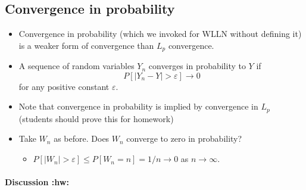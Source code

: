 \subsection{Convergence in probability}
\label{sec-1-3}

\begin{itemize}
\item Convergence in probability (which we invoked for WLLN without
       defining it) is a weaker form of convergence than $L_p$
       convergence.
\item A sequence of random variables $Y_n$ converges in probability to
       $Y$ if \[ P[\lvert Y_n - Y \rvert > \varepsilon] \to 0 \] for
       any positive constant $\varepsilon$.
\item Note that convergence in probability is implied by convergence
       in $L_p$ (students should prove this for homework)
\item Take $W_n$ as before.  Does $W_n$ converge to zero in probability?
\begin{itemize}
\item $P[\lvert W_n \rvert > \varepsilon] \leq P[W_n = n] = 1/n \to
         0$ as $n \to \infty$.
\end{itemize}
\end{itemize}
\paragraph{Discussion \textbf{:hw:}}
\label{sec-1-3-1}

